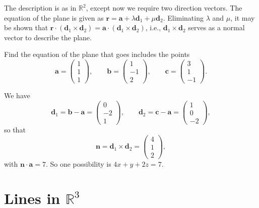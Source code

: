 \documentclass[letter-paper]{tufte-book}
\newenvironment{example}[1][Example]{\begin{trivlist}
\item[\hskip \labelsep {\bfseries #1}]}{\end{trivlist}}
\newcommand{\ab}{\boldsymbol{a}}
\newcommand{\bb}{\boldsymbol{b}}
\newcommand{\cb}{\boldsymbol{c}}
\newcommand{\db}{\boldsymbol{d}}
\newcommand{\nb}{\boldsymbol{n}}
\begin{document}
The description is as in $\mathbb{R}^2$, except now we require two direction
vectors. The equation of the plane is given as $\boldsymbol{r}=\ab+\lambda\db_1
+ \mu\db_2$. Eliminating $\lambda$ and $\mu$, it may be shown that
$\boldsymbol{r}\cdot(\db_1\times\db_2) =\ab\cdot(\db_1\times\db_2)$, i.e.,
$\db_1\times\db_2$ serves as a normal vector to describe the plane.
\begin{example}
	Find the equation of the plane that goes includes the points
	\begin{equation*}
		\ab=\begin{pmatrix}1\\1\\1\end{pmatrix},\qquad
		\bb=\begin{pmatrix}1\\-1\\2\end{pmatrix},\qquad
		\cb=\begin{pmatrix}3\\1\\-1\end{pmatrix}.
	\end{equation*}
	
	We have
	\begin{equation*}
		\db_1=\bb-\ab=\begin{pmatrix}0\\-2\\1\end{pmatrix},\qquad
		\db_2=\cb-\ab=\begin{pmatrix}1\\0\\-2\end{pmatrix},
	\end{equation*}
	so that
	\begin{equation*}
		\nb=\db_1\times\db_2=\begin{pmatrix}4\\1\\2\end{pmatrix},
	\end{equation*}
	with $\nb\cdot\ab=7$. So one possibility is $4x+y+2z=7$.
\end{example}


\section{Lines in $\mathbb{R}^3$}
\end{document}
